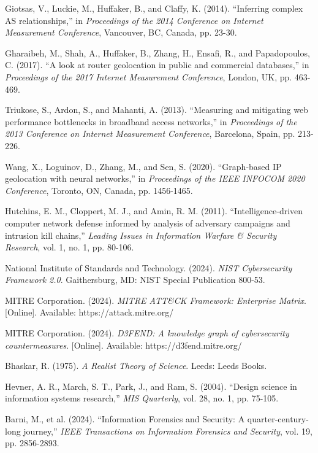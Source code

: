 \begin{thebibliography}{50}
Giotsas, V., Luckie, M., Huffaker, B., and Claffy, K. (2014). ``Inferring complex AS relationships,'' in \textit{Proceedings of the 2014 Conference on Internet Measurement Conference}, Vancouver, BC, Canada, pp. 23-30.

Gharaibeh, M., Shah, A., Huffaker, B., Zhang, H., Ensafi, R., and Papadopoulos, C. (2017). ``A look at router geolocation in public and commercial databases,'' in \textit{Proceedings of the 2017 Internet Measurement Conference}, London, UK, pp. 463-469.

Triukose, S., Ardon, S., and Mahanti, A. (2013). ``Measuring and mitigating web performance bottlenecks in broadband access networks,'' in \textit{Proceedings of the 2013 Conference on Internet Measurement Conference}, Barcelona, Spain, pp. 213-226.

Wang, X., Loguinov, D., Zhang, M., and Sen, S. (2020). ``Graph-based IP geolocation with neural networks,'' in \textit{Proceedings of the IEEE INFOCOM 2020 Conference}, Toronto, ON, Canada, pp. 1456-1465.

Hutchins, E. M., Cloppert, M. J., and Amin, R. M. (2011). ``Intelligence-driven computer network defense informed by analysis of adversary campaigns and intrusion kill chains,'' \textit{Leading Issues in Information Warfare \& Security Research}, vol. 1, no. 1, pp. 80-106.

National Institute of Standards and Technology. (2024). \textit{NIST Cybersecurity Framework 2.0}. Gaithersburg, MD: NIST Special Publication 800-53.

MITRE Corporation. (2024). \textit{MITRE ATT\&CK Framework: Enterprise Matrix}. [Online]. Available: https://attack.mitre.org/

MITRE Corporation. (2024). \textit{D3FEND: A knowledge graph of cybersecurity countermeasures}. [Online]. Available: https://d3fend.mitre.org/

Bhaskar, R. (1975). \textit{A Realist Theory of Science}. Leeds: Leeds Books.

Hevner, A. R., March, S. T., Park, J., and Ram, S. (2004). ``Design science in information systems research,'' \textit{MIS Quarterly}, vol. 28, no. 1, pp. 75-105.

Barni, M., et al. (2024). ``Information Forensics and Security: A quarter-century-long journey,'' \textit{IEEE Transactions on Information Forensics and Security}, vol. 19, pp. 2856-2893.


\end{thebibliography}
